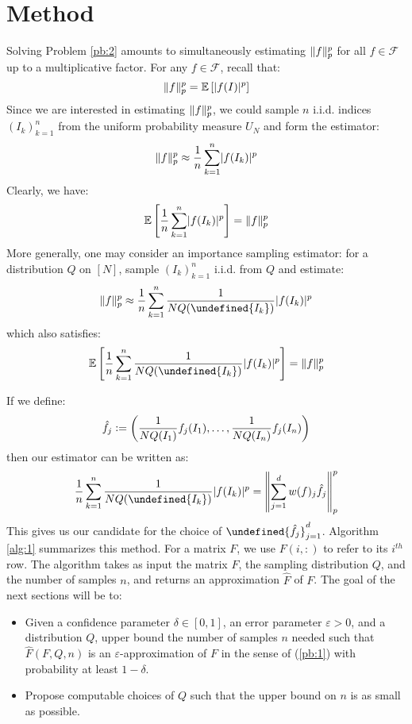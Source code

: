 \documentclass{article}
\makeatletter
\theoremstyle{plain}
\theoremstyle{definition}
\theoremstyle{remark}
\newcommand{\defeq}{\vcentcolon=}
\let\brace\undefined
\DeclarePairedDelimiter{\brace}{\lbrace}{\rbrace}
\DeclarePairedDelimiter{\paren}{\lparen}{\rparen}
\newcommand{\eps}{\varepsilon}
\DeclarePairedDelimiter{\abs}{\lvert}{\rvert}
\DeclarePairedDelimiter{\norm}{\lVert}{\rVert}
\newcommand{\E}[1]{\mathbb{E}\left[#1\right]}
\newcommand{\iid}{i.i.d.\@\xspace}
\makeatother
\begin{document}
\section{Method}
Solving Problem \ref{pb:2} amounts to simultaneously estimating $\norm{f}_p^p$ for all $f \in \mathcal{F}$ up to a multiplicative factor. For any $f \in \mathcal{F}$, recall that:
\begin{equation*}
    \norm{f}_p^p = \E{\abs{f(I)}^p}
\end{equation*}
Since we are interested in estimating $\norm{f}_p^p$, we could sample $n$ \iid indices $(I_k)_{k=1}^{n}$ from the uniform probability measure $U_N$ and form the estimator:
\begin{equation*}
    \norm{f}_p^p \approx \frac{1}{n} \sum_{k=1}^{n} \abs{f(I_k)}^p
\end{equation*}
Clearly, we have:
\begin{equation*}
    \E{\frac{1}{n} \sum_{k=1}^{n} \abs{f(I_k)}^p} = \norm{f}_p^p
\end{equation*}
More generally, one may consider an importance sampling estimator: for a distribution $Q$ on $[N]$, sample $(I_k)_{k=1}^{n}$ \iid from $Q$ and estimate:
\begin{equation*}
    \norm{f}_p^p \approx \frac{1}{n} \sum_{k=1}^{n} \frac{1}{NQ(\brace{I_k})} \abs{f(I_k)}^p
\end{equation*}
which also satisfies:
\begin{equation*}
    \E{\frac{1}{n} \sum_{k=1}^{n} \frac{1}{NQ(\brace{I_k})} \abs{f(I_k)}^p} = \norm{f}_p^p
\end{equation*}

If we define:
\begin{equation*}
    \hat{f}_j \defeq \paren*{\frac{1}{N Q(I_1)} f_j(I_1), \dotsc, \frac{1}{N Q(I_n)}f_j(I_n)}
\end{equation*}
then our estimator can be written as:
\begin{equation*}
    \frac{1}{n} \sum_{k=1}^{n} \frac{1}{NQ(\brace{I_k})} \abs{f(I_k)}^p = \norm*{\sum_{j=1}^{d} w(f)_j \hat{f}_j}_p^p
\end{equation*}
This gives us our candidate for the choice of $\brace{\hat{f}_j}_{j=1}^{d}$. Algorithm \ref{alg:1} summarizes this method. For a matrix $F$, we use $F(i, :)$ to refer to its $i^{th}$ row. The algorithm takes as input the matrix $F$, the sampling distribution $Q$, and the number of samples $n$, and returns an approximation $\widehat{F}$ of $F$. The goal of the next sections will be to:
\begin{itemize}
    \item Given a confidence parameter $\delta \in [0, 1]$, an error parameter $\eps > 0$, and a distribution $Q$, upper bound the number of samples $n$ needed such that $\widehat{F}(F, Q, n)$ is an $\eps$-approximation of $F$ in the sense of (\ref{pb:1}) with probability at least $1-\delta$.
    \item Propose computable choices of $Q$ such that the upper bound on $n$ is as small as possible.
\end{itemize}
\end{document}
